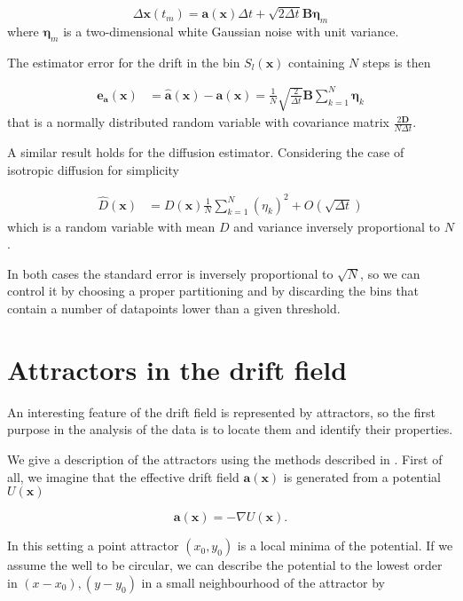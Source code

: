 \documentclass[a4paper]{article}
\begin{document}
\begin{equation}
\Delta \bm{x}(t_m) = \bm{a}(\bm{x}) \Delta t + \sqrt{2 \Delta t} \bm{B} \bm{\eta}_m
\end{equation}
where $\bm{\eta}_m$ is a two-dimensional white Gaussian noise with unit variance.

The estimator error for the drift in the bin $S_l(\bm{x})$ containing $N$ steps is then

\begin{align}
\bm{e_a}(\bm{x}) &= \hat{\bm{a}}(\bm{x}) - \bm{a}(\bm{x}) = \frac{1}{N} \sqrt{\frac{2}{\Delta t}} \bm{B} \sum_{k = 1}^N \bm{\eta}_k
\end{align}
that is a normally distributed random variable with covariance matrix $\frac{2 \bm{D}}{N \Delta t}$.

A similar result holds for the diffusion estimator. Considering the case of isotropic diffusion for simplicity

\begin{align}
\hat{D}(\bm{x}) &= D(\bm{x}) \frac{1}{N} \sum_{k = 1}^N \left(\eta_k\right)^2 + O(\sqrt{\Delta t})
\end{align}
which is a random variable with mean $D$ and variance inversely proportional to $N$.

In both cases the standard error is inversely proportional to $\sqrt{N}$, so we can control it by choosing a proper partitioning and by discarding the bins that contain a number of datapoints lower than a given threshold.


\section{Attractors in the drift field}

An interesting feature of the drift field is represented by attractors, so the first purpose in the analysis of the data is to locate them and identify their properties.

We give a description of the attractors using the methods described in \cite{hoze2012}. First of all, we imagine that the effective drift field $\bm{a}(\bm{x})$ is generated from a potential $U(\bm{x})$

\begin{equation}
\bm{a}(\bm{x}) = -\nabla U(\bm{x}).
\end{equation}

In this setting a point attractor $(x_0, y_0)$ is a local minima of the potential. If we assume the well to be circular, we can describe the potential to the lowest order in $(x - x_0), (y - y_0)$ in a small neighbourhood of the attractor by
\end{document}
